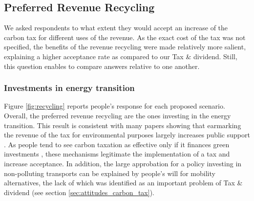 \documentclass[english,5p,authoryear]{elsarticle}
\begin{document}
    \subsection{Preferred Revenue Recycling}

We asked respondents to what extent they would accept an increase of the carbon tax for different uses of the revenue. As the exact cost of the tax was not specified, the benefits of the revenue recycling were made relatively more salient, explaining a higher acceptance rate as compared to our Tax \& dividend. Still, this question enables to compare answers relative to one another.

        \subsubsection{Investments in energy transition}

Figure \ref{fig:recycling} reports people's response for each proposed scenario. Overall, the preferred revenue recycling are the ones investing in the energy transition. This result is consistent with many papers showing that earmarking the revenue of the tax for environmental purposes largely increases public support \citep[for a review of the literature, see for instance][]{kallbekken_aasen_2010,carattini_overcoming_2018}. As people tend to see carbon taxation as effective only if it finances green investments \citep{saelen_kallbekken_2011}, these mechanisms legitimate the implementation of a tax and increase acceptance. In addition, the large approbation for a policy investing in non-polluting transports can be explained by people's will for mobility alternatives, the lack of which was identified as an important problem of Tax \& dividend (see section \ref{sec:attitudes_carbon_tax}). 
\end{document}
